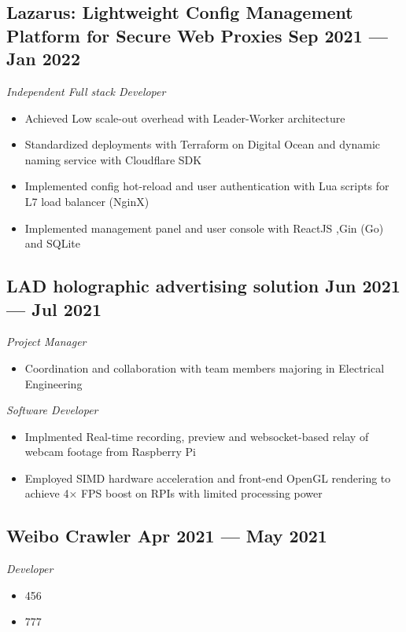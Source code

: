 \documentclass[a4,12pt]{article}
\newcommand{\subtext}[1]{
#1\par\vspace{-0.3cm}}
\newenvironment{zitemize}{
\begin{itemize}\itemsep0pt \parskip0pt \parsep1pt}
{\end{itemize}\vspace{-0.5cm}}
\begin{document}
\subsection*{Lazarus: {\normalsize\normalfont Lightweight Config Management Platform for Secure Web Proxies} \hfill \textbf{Sep 2021 --- Jan 2022}}
\subtext{\textit{Independent Full stack Developer}}
\begin{zitemize}
    \item Achieved Low scale-out overhead with Leader-Worker architecture
    \item Standardized deployments with Terraform on Digital Ocean and dynamic naming service with Cloudflare SDK
    \item Implemented config hot-reload and user authentication with Lua scripts for L7 load balancer (NginX)
    \item Implemented management panel and user console with ReactJS ,Gin (Go) and SQLite
\end{zitemize}


\subsection*{LAD holographic advertising solution \hfill \textbf{Jun 2021 --- Jul 2021}}
\subtext{\textit{Project Manager}}
\begin{zitemize}
    \item Coordination and collaboration with team members majoring in Electrical Engineering
\end{zitemize}

\vspace{0.3cm}
\subtext{\textit{Software Developer}}
\begin{zitemize}
    \item Implmented Real-time recording, preview and websocket-based relay of webcam footage from Raspberry Pi
    \item Employed SIMD hardware acceleration and front-end OpenGL rendering to achieve 4× FPS boost on RPIs with limited processing power
\end{zitemize}

\subsection*{Weibo Crawler \hfill \textbf{Apr 2021 --- May 2021}}
\subtext{\textit{Developer}}
\begin{zitemize}
    \item 456
    \item 777
\end{zitemize}
\end{document}
